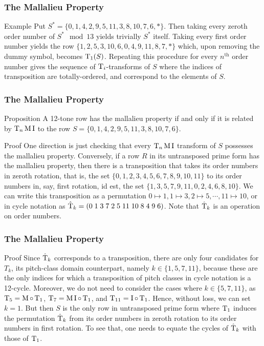 
\begin{frame}
	\frametitle{The Mallalieu Property}
	\begin{block}{Example}
	Put $S^* = \{ 0, 1, 4, 2, 9, 5, 11, 3, 8, 10, 7, 6, * \}$. Then taking every zeroth order number of $S^* \mod 13$ yields trivially $S^*$ itself. Taking every first order number yields the row $\{ 1, 2, 5, 3, 10, 6, 0, 4, 9, 11, 8, 7, * \}$ which, upon removing the dummy symbol, becomes $\operatorname{T}_1(S)$. Repeating this procedure for every $n^\text{th}$ order number gives the sequence of $\operatorname{T}_i$-transforms of $S$ where the indices of transposition are totally-ordered, and correspond to the elements of $S$.
	\end{block}
\end{frame}

\begin{frame}
\frametitle{The Mallalieu Property}
	\begin{block}{Proposition}
		A 12-tone row has the mallalieu property if and only if it is related by $\operatorname{T}_n\operatorname{M}\operatorname{I}$ to the row $S = \{ 0, 1, 4, 2, 9, 5, 11, 3, 8, 10, 7, 6 \}$.
	\end{block}
	\begin{block}{Proof}
		One direction is just checking that every $\operatorname{T}_n\operatorname{M}\operatorname{I}$ transform of $S$ possesses the mallalieu property. Conversely, if a row $R$ in its untransposed prime form has the mallalieu property, then there is a transposition that takes its order numbers in zeroth rotation, that is, the set $\{ 0, 1, 2, 3, 4, 5, 6, 7, 8, 9, 10, 11 \}$ to its order numbers in, say, first rotation, id est, the set $\{ 1, 3, 5, 7, 9, 11, 0, 2, 4, 6, 8, 10 \}$. We can write this transposition as a permutation $0 \mapsto 1, 1 \mapsto 3, 2 \mapsto 5, \cdots, 11 \mapsto 10 $, or in cycle notation as $\hat{\operatorname{T}}_k = ( 0 \; 1 \; 3 \; 7 \; 2 \; 5 \; 11 \; 10 \; 8 \; 4 \; 9 \; 6 )$. Note that $\hat{\operatorname{T}}_k$ is an operation on order numbers.
	\end{block}
\end{frame}

\begin{frame}
\frametitle{The Mallalieu Property}
	\begin{block}{Proof}
	Since $\hat{\operatorname{T}}_k$ corresponds to a transposition, there are only four candidates for $T_k$, its pitch-class domain counterpart, namely $k \in \{ 1, 5, 7, 11 \}$, because these are the only indices for which a transposition of pitch classes in cycle notation is a 12-cycle. Moreover, we do not need to consider the cases where $k \in \{5, 7, 11\}$, as $\operatorname{T}_5 = \operatorname{M} \circ \operatorname{T}_1$, $\operatorname{T}_7 = \operatorname{M} \operatorname{I} \circ \operatorname{T}_1$, and $\operatorname{T}_{11} = \operatorname{I} \circ \operatorname{T}_1$. Hence, without loss, we can set $k = 1$. But then $S$ is the only row in untransposed prime form where $\operatorname{T}_1$ induces the permutation $\hat{\operatorname{T}}_k$ from its order numbers in zeroth rotation to its order numbers in first rotation. To see that, one needs to equate the cycles of $\hat{\operatorname{T}}_k$ with those of $\operatorname{T}_1$.
	\end{block}
\end{frame}

